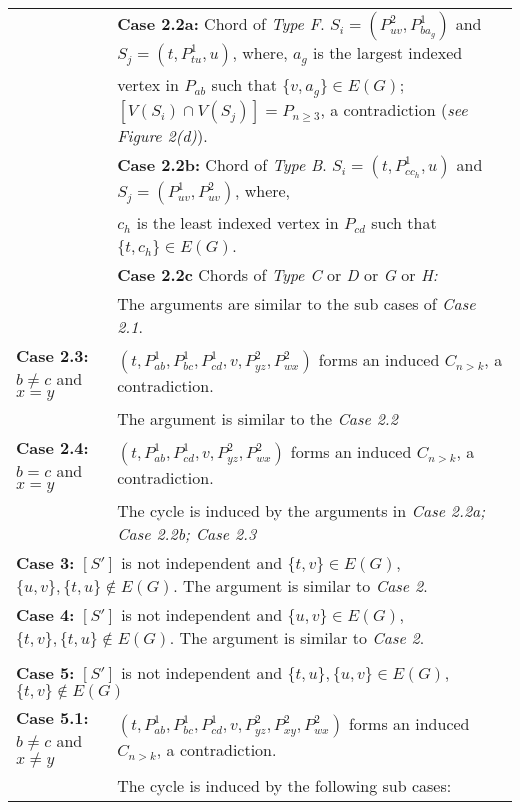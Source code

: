 \documentclass[runningheads]{llncs}
\begin{document}
\begin{table}[H]
\begin{tabular}{|l|l|}
& \textbf{Case 2.2a:} Chord of \emph{Type F}. $S_i=(P_{uv}^{2},P_{ba_g}^{1})$ and $S_j = (t,P_{tu}^{1},u)$, where, $a_g$ is the largest indexed \\ 
& vertex in $P_{ab}$ such that $\{v,a_g\} \in E(G)$; $[V(S_i)\cap V(S_j)] = P_{n \geq 3}$, a contradiction (\emph{see Figure 2(d)}). \\ \cline{2-2}
& \textbf{Case 2.2b:} Chord of \emph{Type B}.  $S_i=(t,P_{cc_h}^{1},u)$ and $S_j=(P_{uv}^{1},P_{uv}^{2})$, where, \\ 
 & $c_h$ is the least indexed vertex in $P_{cd}$ such that $\{t,c_h\} \in E(G)$. \\ \cline{2-2}
&\textbf{Case 2.2c} Chords of \emph{Type C} or \emph{D} or \emph{G} or \emph{H:}\\
&  The arguments are similar to the sub cases of \emph{Case 2.1}. \\ \hline
\textbf{Case 2.3:} $b \neq c$ and $x = y$ & $(t, P_{ab}^{1}, P_{bc}^{1}, P_{cd}^{1}, v, P_{yz}^{2}, P_{wx}^{2})$ forms an induced $C_{n >k}$, a contradiction. \\
  & The argument is similar to the \emph{Case 2.2}\\ \hline
\textbf{Case 2.4:} $b = c$ and $x = y$ & $(t, P_{ab}^{1}, P_{cd}^{1}, v, P_{yz}^{2}, P_{wx}^{2})$ forms an induced $C_{n >k}$, a contradiction. \\ 
& The cycle is induced by the arguments in \emph{Case 2.2a; Case 2.2b; Case 2.3}\\ \hline
\multicolumn{2}{|l|}{\textbf{Case 3:} $[S']$ is not independent and $\{t,v\} \in E(G)$, $\{u,v\},\{t,u\} \notin E(G)$. The argument is similar to \emph{Case 2}.} \\ \hline

\multicolumn{2}{|l|}{\textbf{Case 4:} $[S']$ is not independent and $\{u,v\} \in E(G)$, $\{t,v\},\{t,u\} \notin E(G)$. The argument is similar to \emph{Case 2}.} \\ \hline

\multicolumn{2}{l}{\textbf{ }} \\
\multicolumn{2}{l}{\textbf{Case 5:} $[S']$ is not independent and $\{t,u\},\{u,v\} \in E(G)$, $\{t,v\} \notin E(G)$ }\\ \hline
\textbf{Case 5.1:} $b \neq c$ and $ x \neq y$ & $(t, P_{ab}^{1}, P_{bc}^{1}, P_{cd}^{1}, v, P_{yz}^{2}, P_{xy}^{2}, P_{wx}^{2})$ forms an induced $C_{n >k}$, a contradiction. \\ \hline
& The cycle is induced by the following sub cases:\\ \cline{2-2}


\end{tabular}
\end{table}
\end{document}
